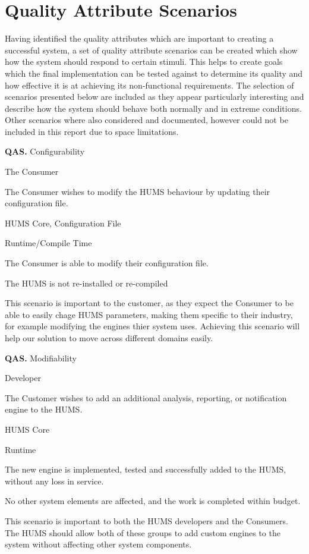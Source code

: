 \documentclass[10pt,a4paper]{article}
\newcommand{\qas}[1]{\textcolor{reqColor}{\textbf{QAS.#1}}}
\newenvironment{scenario}[1]{
\newcommand{\source}[1]{\item[Source of Stimulus:] ##1}
\newcommand{\stimulus}[1]{\item[Stimulus:] ##1}
\newcommand{\artifact}[1]{\item[Artifact:] ##1}
\newcommand{\environment}[1]{\item[Environment:] ##1}
\newcommand{\response}[1]{\item[Response:] ##1}
\newcommand{\measure}[1]{\item[Response Measure:] ##1}
\newcommand{\rationale}[1]{\item[Scenario Rationale:] ##1}
\newcommand{\quality}[1]{\item[Quality:] ##1}
		\begin{description} [noitemsep]	
		\item[Scenario ID:] \qas{#1}
		}{\end{description} \vspace*{0.3cm}
		}
\begin{document}
\section{Quality Attribute Scenarios}
\label{sec:scenarios}
Having identified the quality attributes which are important to creating a successful system, a set of quality attribute scenarios can be created which show how the system should respond to certain stimuli. This helps to create goals which the final implementation can be tested against to determine its quality and how effective it is at achieving its non-functional requirements. The selection of scenarios presented below are included as they appear particularly interesting and describe how the system should behave both normally and in extreme conditions. Other scenarios where also considered and documented, however could not be included in this report due to space limitations.

\begin{scenario}{1}
\quality{Configurability}
\source{The Consumer}
\stimulus{The Consumer wishes to modify the HUMS behaviour by updating their configuration file.}
\artifact{HUMS Core, Configuration File}
\environment{Runtime/Compile Time}
\response{The Consumer is able to modify their configuration file.}
\measure{ The HUMS is not re-installed or re-compiled}
\rationale{This scenario is important to the customer, as they expect the Consumer to be able to easily chage HUMS parameters, making them specific to their industry, for example modifying the engines thier system uses. Achieving this scenario will help our solution to move across different domains easily.}
\end{scenario}

\begin{scenario}{2}
\quality{Modifiability}
\source{Developer}
\stimulus{The Customer wishes to add an additional analysis, reporting, or notification engine to the HUMS.}
\artifact{HUMS Core}
\environment{Runtime}
\response{The new engine is implemented, tested and successfully added to the HUMS, without any loss in service.}
\measure{No other system elements are affected, and the work is completed within budget.}
\rationale{This scenario is important to both the HUMS developers and the Consumers. The HUMS should allow both of these groups to add custom engines to the system without affecting other system components.}
\end{scenario}
\end{document}
